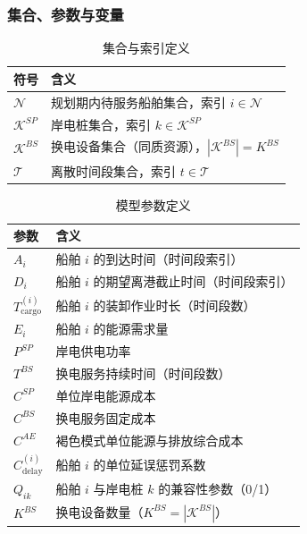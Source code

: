 \documentclass[UTF8, a4paper, 12pt]{ctexart}
\begin{document}
\subsubsection{集合、参数与变量}

\begin{table}[htbp]
\centering
\caption{集合与索引定义}
\begin{tabular}{ll}
\toprule
符号 & 含义 \\
\midrule
$\mathcal{N}$ & 规划期内待服务船舶集合，索引 $i \in \mathcal{N}$ \\
$\mathcal{K}^{SP}$ & 岸电桩集合，索引 $k \in \mathcal{K}^{SP}$ \\
$\mathcal{K}^{BS}$ & 换电设备集合（同质资源），$|\mathcal{K}^{BS}| = K^{BS}$ \\
$\mathcal{T}$ & 离散时间段集合，索引 $t \in \mathcal{T}$ \\
\bottomrule
\end{tabular}
\end{table}


\begin{table}[htbp]
\centering
\caption{模型参数定义}
\begin{tabular}{ll}
\toprule
参数 & 含义 \\
\midrule
$A_i$ & 船舶 $i$ 的到达时间（时间段索引） \\
$D_i$ & 船舶 $i$ 的期望离港截止时间（时间段索引） \\
$T^{(i)}_{\text{cargo}}$ & 船舶 $i$ 的装卸作业时长（时间段数） \\
$E_i$ & 船舶 $i$ 的能源需求量 \\
$P^{SP}$ & 岸电供电功率 \\
$T^{BS}$ & 换电服务持续时间（时间段数） \\
$C^{SP}$ & 单位岸电能源成本 \\
$C^{BS}$ & 换电服务固定成本 \\
$C^{AE}$ & 褐色模式单位能源与排放综合成本 \\
$C^{(i)}_{\text{delay}}$ & 船舶 $i$ 的单位延误惩罚系数 \\
$Q_{ik}$ & 船舶 $i$ 与岸电桩 $k$ 的兼容性参数（0/1） \\
$K^{BS}$ & 换电设备数量（$K^{BS}=|\mathcal{K}^{BS}|$） \\
\bottomrule
\end{tabular}
\end{table}
\end{document}

